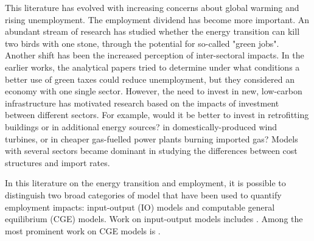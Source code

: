 This literature has evolved with increasing concerns about global warming and rising unemployment. The employment dividend has become more important. An abundant stream of research has studied whether the energy transition can kill two birds with one stone, through the potential for so-called "green jobs".
Another shift has been the increased perception of inter-sectoral impacts.
In the earlier works, the analytical papers \citep{Bovenberg1994, Bovenberg1996} tried to determine under what conditions a better use of green taxes could reduce unemployment, but they considered an economy with one single sector.
However, the need to invest in new, low-carbon infrastructure has motivated research based on the impacts of investment between different sectors. For example, would it be better to invest in retrofitting buildings or in additional energy sources? in domestically-produced wind turbines, or in cheaper gas-fuelled power plants burning imported gas? 
Models with several sectors became dominant in studying the differences between cost structures and import rates.

In this literature on the energy transition and employment, it is possible to distinguish two broad categories of model that have been used to quantify employment impacts: input-output (IO) models and computable general equilibrium (CGE) models.
Work on input-output models includes \citet{Hillebrand2006, Scott2008, deArce2012, Markaki2013, Hartwig2016, Yushchenko2016, Li2016, Garrett2017}.
Among the most prominent work on CGE models is \citet{Lehr2008, Lehr2012, Bohringer2013, Blazejczak2014, Creutzig2014, Duscha2014, Duscha2016}.

